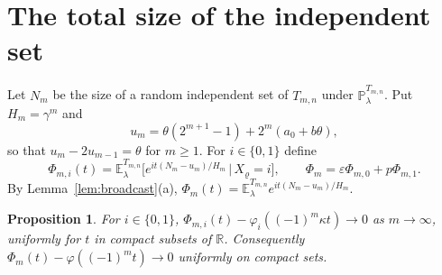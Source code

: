 \documentclass{amsart}
\newtheorem{proposition}[theorem]{Proposition}
\theoremstyle{definition}
\theoremstyle{remark}
\numberwithin{equation}{section}
\newcommand{\eps}{\varepsilon}
\newcommand{\E}{\mathbb{E}}
\newcommand{\Prob}{\mathbb{P}}
\newcommand{\R}{\mathbb{R}}
\begin{document}
\section{The total size of the independent set}\label{sec:total}

Let $N_m$ be the size of a random independent set of $T_{m,n}$ under $\Prob^{T_{m,n}}_\lambda$. Put $H_m=\gamma^m$ and
\begin{equation}\label{eq:center}
u_m=\theta(2^{m+1}-1)+2^m(a_0+b\theta),
\end{equation}
so that $u_m-2u_{m-1}=\theta$ for $m\ge1$. For $i\in\{0,1\}$ define
\[
\Phi_{m,i}(t)=\E^{T_{m,n}}_\lambda\bigl[e^{it(N_m-u_m)/H_m}\,\big|\,X_\varrho=i\bigr],\qquad \Phi_m=\eps\Phi_{m,0}+p\Phi_{m,1}.
\]
By Lemma~\ref{lem:broadcast}(a), $\Phi_m(t)=\E^{T_{m,n}}_\lambda e^{it(N_m-u_m)/H_m}$.

\begin{proposition}\label{prop:clt}
For $i\in\{0,1\}$, $\Phi_{m,i}(t)-\varphi_i((-1)^m\kappa t)\to0$ as $m\to\infty$, uniformly for $t$ in compact subsets of $\R$. Consequently $\Phi_m(t)-\varphi((-1)^mt)\to0$ uniformly on compact sets.
\end{proposition}
\end{document}
